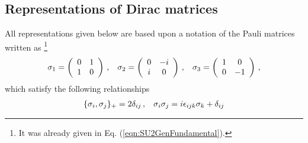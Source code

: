 
\subsection{Representations of Dirac matrices}
All representations given below are based upon
a notation of the Pauli matrices written as
\footnote{%
It was already given in Eq. (\ref{eqn:SU2GenFundamental}).
}%
\begin{eqnarray}
\sigma_1 =
\left(
\begin{array}{cc}
0 & 1 \\ 1 & 0
\end{array}
\right)\,,
\hspace{3mm}
\sigma_2 =
\left(
\begin{array}{cc}
0 & -i \\ i & 0
\end{array}
\right)\,,
\hspace{3mm}
\sigma_3 =
\left(
\begin{array}{cc}
1 &  0\\ 0 & -1
\end{array}
\right)\,,
\end{eqnarray}
which satisfy the following relationships
\begin{eqnarray}
\{
\sigma_i, \sigma_j \}_+ = 2 \delta_{ij}\,,
\hspace{3mm}
\sigma_i \sigma_j = i\epsilon_{ijk} \sigma_k + \delta_{ij}
\end{eqnarray}

